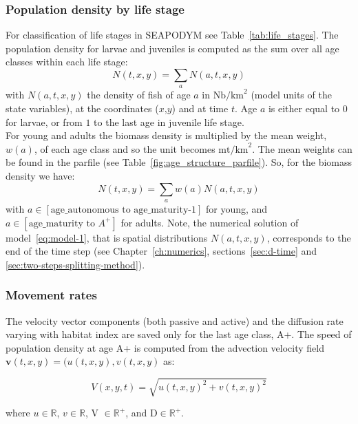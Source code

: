 \subsubsection{Population density by life stage} 
For classification of life stages in SEAPODYM see Table~\ref{tab:life_stages}. The population density for larvae and juveniles is computed as the sum over all age classes within each life stage:
\begin{equation*}
    N(t,x,y) = \sum_{a} N(a,t,x,y) 
\end{equation*}
with $N(a,t,x,y)$ the density of fish of age $a$ in $\text{Nb/km}^{2}$ (model units of the state variables), at the coordinates ($x$,$y$) and at time $t$. Age $a$ is either equal to $0$ for larvae, or from $1$ to the last age in juvenile life stage. \\ 

For young and adults the biomass density is multiplied by the mean weight, $w(a)$, of each age class and so the unit becomes $\text{mt/km}^{2}$. The mean weights can be found in the parfile (see Table~\ref{fig:age_structure_parfile}). So, for the biomass density we have:  
\begin{equation*}
    N(t,x,y) = \sum_{a} w(a)N(a,t,x,y) 
\end{equation*}
\noindent with $a\in\left[\text{age\_autonomous to age\_maturity-1} \right]$ for young, and $a \in\left[\text{age\_maturity to $A^{+}$}\right]$ for adults. Note, the numerical solution of model~\ref{eq:model-1}, that is spatial distributions $N(a,t,x,y)$, corresponds to the end of the time step (see Chapter~\ref{ch:numerics}, sections~\ref{sec:d-time} and \ref{sec:two-steps-splitting-method}). \\ 

\subsubsection{Movement rates} 

The velocity vector components (both passive and active) and the diffusion rate varying with habitat index are saved only for the last age class, A+. The speed of population density at age A+ is computed from the advection velocity field $\mathbf{v}(t,x,y)=(u(t,x,y),v(t,x,y)$ as:

\begin{equation*}
    V(x,y,t) = \sqrt{u(t,x,y)^2+v(t,x,y)^2}
\end{equation*}

\noindent where $u\in\mathbb{R}$, $v\in\mathbb{R}$, V $\in\mathbb{R^{+}}$, and D$\in\mathbb{R^{+}}$.

